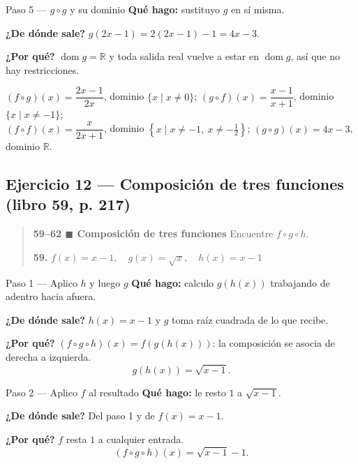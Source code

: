 \documentclass[11pt]{article}
\begin{document}
\begin{paso}{Paso 5 --- $g\circ g$ y su dominio}
\textbf{Qué hago:} sustituyo $g$ en sí misma.

\textbf{¿De dónde sale?} $g(2x-1)=2(2x-1)-1=4x-3$.

\textbf{¿Por qué?} $\operatorname{dom} g=\mathbb{R}$ y toda salida real vuelve a estar en $\operatorname{dom} g$, así que no hay restricciones.
\end{paso}

\begin{resp}
$(f\circ g)(x)=\dfrac{2x-1}{2x}$, dominio $\{x\mid x\neq 0\}$;\quad
$(g\circ f)(x)=\dfrac{x-1}{x+1}$, dominio $\{x\mid x\neq -1\}$;\\[2pt]
$(f\circ f)(x)=\dfrac{x}{2x+1}$, dominio $\left\{x\mid x\neq -1,\ x\neq -\tfrac12\right\}$;\quad
$(g\circ g)(x)=4x-3$, dominio $\mathbb{R}$.
\end{resp}

\subsection*{Ejercicio 12 — Composición de tres funciones (libro 59, p. 217)}

\begin{quote}
\textbf{59--62 $\blacksquare$ Composición de tres funciones} \quad Encuentre $f\circ g\circ h$.

\textbf{59.} $f(x)=x-1, \quad g(x)=\sqrt{x}, \quad h(x)=x-1$
\end{quote}

\begin{paso}{Paso 1 --- Aplico $h$ y luego $g$}
\textbf{Qué hago:} calculo $g(h(x))$ trabajando de adentro hacia afuera.

\textbf{¿De dónde sale?} $h(x)=x-1$ y $g$ toma raíz cuadrada de lo que recibe.

\textbf{¿Por qué?} $(f\circ g\circ h)(x)=f(g(h(x)))$: la composición se asocia de derecha a izquierda.
\[
g(h(x))=\sqrt{x-1}.
\]
\end{paso}

\begin{paso}{Paso 2 --- Aplico $f$ al resultado}
\textbf{Qué hago:} le resto $1$ a $\sqrt{x-1}$.

\textbf{¿De dónde sale?} Del paso 1 y de $f(x)=x-1$.

\textbf{¿Por qué?} $f$ resta $1$ a cualquier entrada.
\[
(f\circ g\circ h)(x)=\sqrt{x-1}-1 .
\]
\end{paso}
\end{document}

